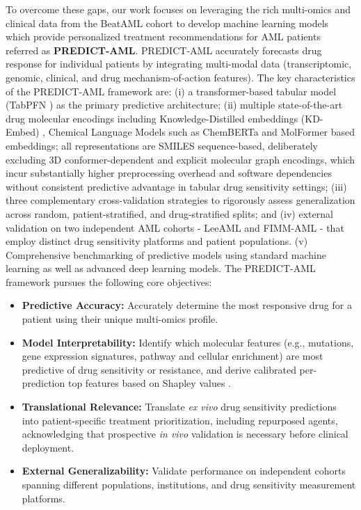 \documentclass[pdflatex,sn-mathphys-num]{sn-jnl}
\theoremstyle{thmstyleone}
\theoremstyle{thmstyletwo}
\theoremstyle{thmstylethree}
\begin{document}
To overcome these gaps, our work focuses on leveraging the rich multi-omics and clinical data from the BeatAML cohort to develop machine learning models \cite{lecun2015deep} which provide personalized treatment recommendations for AML patients referred as \textbf{PREDICT-AML}. PREDICT-AML accurately forecasts drug response for individual patients by integrating multi-modal data (transcriptomic, genomic, clinical, and drug mechanism-of-action features). The key characteristics of the PREDICT-AML framework are: (i) a transformer-based tabular model (TabPFN \cite{hollmann2023tabpfn}) as the primary predictive architecture; (ii) multiple state-of-the-art drug molecular encodings including Knowledge-Distilled embeddings (KD-Embed) \cite{mall2021modeling}, Chemical Language Models such as ChemBERTa \cite{chithrananda2020chemberta} and MolFormer \cite{ross2022large} based embeddings; all representations are SMILES sequence-based, deliberately excluding 3D conformer-dependent and explicit molecular graph encodings, which incur substantially higher preprocessing overhead and software dependencies without consistent predictive advantage in tabular drug sensitivity settings; (iii) three complementary cross-validation strategies to rigorously assess generalization across random, patient-stratified, and drug-stratified splits; and (iv) external validation on two independent AML cohorts - LeeAML \cite{lee2018machine} and FIMM-AML \cite{malani2022implementing} - that employ distinct drug sensitivity platforms and patient populations. (v) Comprehensive benchmarking of predictive models using standard machine learning as well as advanced deep learning models. The PREDICT-AML framework pursues the following core objectives:
\begin{itemize}
    \item \textbf{Predictive Accuracy:} Accurately determine the most responsive drug for a patient using their unique multi-omics profile.
    \item \textbf{Model Interpretability:} Identify which molecular features (e.g., mutations, gene expression signatures, pathway and cellular enrichment) are most predictive of drug sensitivity or resistance, and derive calibrated per-prediction top features based on Shapley values \cite{shapley1953stochastic}.
    \item \textbf{Translational Relevance:} Translate \textit{ex vivo} drug sensitivity predictions into patient-specific treatment prioritization, including repurposed agents, acknowledging that prospective \textit{in vivo} validation is necessary before clinical deployment.
    \item \textbf{External Generalizability:} Validate performance on independent cohorts spanning different populations, institutions, and drug sensitivity measurement platforms.
\end{itemize}
\end{document}
